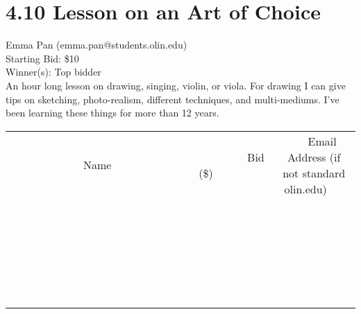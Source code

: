\documentclass[11pt]{article}
\begin{document}
\section*{4.10 Lesson on an Art of Choice}
Emma Pan (emma.pan@students.olin.edu) \\
Starting Bid: \$10 \\
Winner(s): 
Top bidder \\
An hour long lesson on drawing, singing, violin, or viola. For drawing I can give tips on sketching, photo-realism, different techniques, and multi-mediums. I've been learning these things for more than 12 years. \\[6ex]
\begin{tabular}{c c c}
~~~~~~~~~~~~~Name~~~~~~~~~~~~~ & ~~~~~~~~~Bid (\$)~~~~~~~~~ & ~~~Email Address (if not standard olin.edu)~~~ \\
 & & \\
\hline
 & & \\
\hline
 & & \\
\hline
 & & \\
\hline
 & & \\
\hline
 & & \\
\hline
 & & \\
\hline
 & & \\
\hline
 & & \\
\hline
 & & \\
\hline
 & & \\
\hline
 & & \\
\hline
 & & \\
\hline
 & & \\
\hline
 & & \\
\hline
 & & \\
\hline
 & & \\
\hline
 & & \\
\hline
 & & \\
\hline
 & & \\
\hline
 & & \\
\hline
 & & \\
\hline
 & & \\
\hline
 & & \\
\hline
 & & \\
\hline
 & & \\
\hline
\end{tabular}
\clearpage
\end{document}

